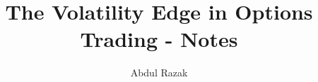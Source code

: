 \documentclass[a4paper,12pt]{book}
\begin{document}
    \author{Abdul Razak}
    \title{The Volatility Edge in Options Trading - Notes}
    \date{}

    \maketitle
    \tableofcontents
    \mainmatter
%    
    
%    
\end{document}
